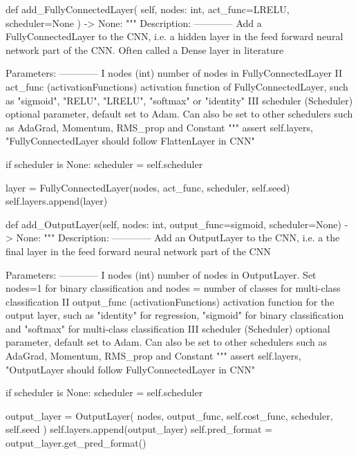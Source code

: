 \documentclass[%
oneside,                 %
final,                   %
10pt]{article}
\begin{document}
    def add_FullyConnectedLayer(
        self, nodes: int, act_func=LRELU, scheduler=None
    ) -> None:
        """
        Description:
        ------------
            Add a FullyConnectedLayer to the CNN, i.e. a hidden layer in the feed forward neural
            network part of the CNN. Often called a Dense layer in literature

        Parameters:
        ------------
            I   nodes (int) number of nodes in FullyConnectedLayer
            II  act_func (activationFunctions) activation function of FullyConnectedLayer,
                such as "sigmoid", "RELU", "LRELU", "softmax" or "identity"
            III scheduler (Scheduler) optional parameter, default set to Adam. Can also be set to other
                schedulers such as AdaGrad, Momentum, RMS_prop and Constant
        """
        assert self.layers, "FullyConnectedLayer should follow FlattenLayer in CNN"

        if scheduler is None:
            scheduler = self.scheduler

        layer = FullyConnectedLayer(nodes, act_func, scheduler, self.seed)
        self.layers.append(layer)

    def add_OutputLayer(self, nodes: int, output_func=sigmoid, scheduler=None) -> None:
        """
        Description:
        ------------
            Add an OutputLayer to the CNN, i.e. a the final layer in the feed forward neural
            network part of the CNN

        Parameters:
        ------------
            I   nodes (int) number of nodes in OutputLayer. Set nodes=1 for binary classification and
                nodes = number of classes for multi-class classification
            II  output_func (activationFunctions) activation function for the output layer, such as
                "identity" for regression, "sigmoid" for binary classification and "softmax" for multi-class
                classification
            III scheduler (Scheduler) optional parameter, default set to Adam. Can also be set to other
                schedulers such as AdaGrad, Momentum, RMS_prop and Constant
        """
        assert self.layers, "OutputLayer should follow FullyConnectedLayer in CNN"

        if scheduler is None:
            scheduler = self.scheduler

        output_layer = OutputLayer(
            nodes, output_func, self.cost_func, scheduler, self.seed
        )
        self.layers.append(output_layer)
        self.pred_format = output_layer.get_pred_format()
\end{document}
